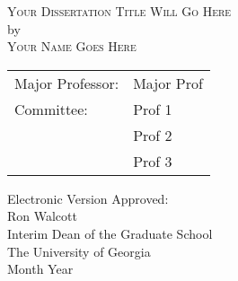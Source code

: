 \documentclass[12pt, notitlepage, twoside]{report}
\begin{document}
\newcommand{\doctitle}{Your Dissertation Title Will Go Here}
\newcommand{\docauthor}{Your Name Goes Here}


%

\newcommand{\degreesearned}{%
B.S., University of Georgia, 2018\\
  Enter only degrees already completed. Follow example above\\
  If degree was obtained outside of the US, the country \\
  of the school and date obtained will need to be provided.
}%

\newcommand{\degreetype}{[Dissertation or Thesis]}
\newcommand{\degreetitle}{[Doctor or Master]}
\newcommand{\degreename}{[Degree Name]}
\newcommand{\degreeyear}{2020}
\maketitlepage


\newpage
\thispagestyle{empty}
\vspace*{18pt}
\begin{center}
  \textsc{\doctitle}\\[18pt]
  by\\[18pt]
  \textsc{\docauthor}
\end{center}
\vfill

\begin{flushright}
  \begin{tabular}{ll}
    Major Professor: & Major Prof \\ [8pt]
    Committee: & Prof 1 \\
    & Prof 2 \\
    & Prof 3 \\
  \end{tabular}
\end{flushright}

\vspace*{3cm}

\begin{flushleft}
  Electronic Version Approved:\\[12pt]
  Ron Walcott\\
  Interim Dean of the Graduate School\\
  The University of Georgia\\
  Month Year
\end{flushleft}
\vspace*{1.5cm}
\end{document}
